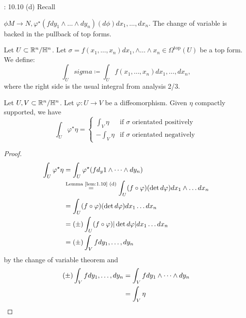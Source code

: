 : 10.10 (d) Recall

\(\phi M\to N,\varphi^\star(fdy_1\wedge\dots\wedge dy_n)(d\phi)dx_1,\dots,dx_n\).
The change of variable is backed in the pullback of top forms.

\begin{definition*}
    Let \(U\subset\mathbb{R}^n/\mathbb{H}^n\). Let \(\sigma=f(x_1,\dots,x_n)dx_1,\wedge\dots\wedge x_n\in\Omega^{\text{top}}(U)\)
    be a  top form. We define:
    \[ \int_U sigma\coloneqq \int_U f(x_1,\dots,x_n)dx_1,\dots,dx_n,\]
    where the right side is the usual integral from analysis 2/3.
\end{definition*}

\begin{lemma}\label{lem:11.6}
    Let \(U,V\subset \mathbb{R}^n/\mathbb{H}^n\). Let \(\varphi:U\to V\) be a diffeomorphism. Given \(\eta\) compactly supported,
    we have \[\int_U \varphi^\star \eta=\begin{cases}
        \int_V \eta & \text{if } \sigma\text{ orientated positively}\\
        -\int_V \eta & \text{if } \sigma\text{ orientated negatively}
    \end{cases}\] 
\end{lemma}
\begin{proof}
    \begin{align*}
        \int_U \varphi^\star \eta&=\int_U \varphi^\star(fd_y1\wedge \dots\wedge dy_n)\\
        &\stackrel{\text{Lemma \ref{lem:1.10} (d)}}{=}\int_U (f\circ \varphi)(\det d\varphi) dx_1\wedge \dots dx_n\\
        &= \int_U (f\circ \varphi)(\det d\varphi) dx_1\dots dx_n\\
        &=(\pm)\int_U (f\circ \varphi)|\det d\varphi| dx_1\dots dx_n\\
        &=(\pm) \int_V f dy_1,\dots,dy_n
    \end{align*}
    by the change of variable theorem and 
    \begin{align*}
        (\pm) \int_V f dy_1,\dots,dy_n &= \int_V f dy_1\wedge\dots\wedge dy_n\\
        &=\int_V \eta\qedhere
    \end{align*}
\end{proof}


